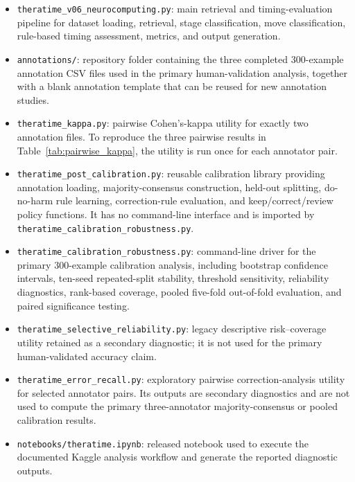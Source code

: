 \documentclass[preprint,12pt,a4paper]{elsarticle}
\begin{document}
\begin{itemize}
    \item \texttt{theratime\_v06\_neurocomputing.py}: main retrieval and timing-evaluation pipeline for dataset loading, retrieval, stage classification, move classification, rule-based timing assessment, metrics, and output generation.
    \item \texttt{annotations/}: repository folder containing the three completed 300-example annotation CSV files used in the primary human-validation analysis, together with a blank annotation template that can be reused for new annotation studies.
    \item \texttt{theratime\_kappa.py}: pairwise Cohen's-kappa utility for exactly two annotation files. To reproduce the three pairwise results in Table~\ref{tab:pairwise_kappa}, the utility is run once for each annotator pair.
    \item \texttt{theratime\_post\_calibration.py}: reusable calibration library providing annotation loading, majority-consensus construction, held-out splitting, do-no-harm rule learning, correction-rule evaluation, and keep/correct/review policy functions. It has no command-line interface and is imported by \texttt{theratime\_calibration\_robustness.py}.
    \item \texttt{theratime\_calibration\_robustness.py}: command-line driver for the primary 300-example calibration analysis, including bootstrap confidence intervals, ten-seed repeated-split stability, threshold sensitivity, reliability diagnostics, rank-based coverage, pooled five-fold out-of-fold evaluation, and paired significance testing.
    \item \texttt{theratime\_selective\_reliability.py}: legacy descriptive risk--coverage utility retained as a secondary diagnostic; it is not used for the primary human-validated accuracy claim.
    \item \texttt{theratime\_error\_recall.py}: exploratory pairwise correction-analysis utility for selected annotator pairs. Its outputs are secondary diagnostics and are not used to compute the primary three-annotator majority-consensus or pooled calibration results.
    \item \texttt{notebooks/theratime.ipynb}: released notebook used to execute the documented Kaggle analysis workflow and generate the reported diagnostic outputs.
\end{itemize}
\end{document}
